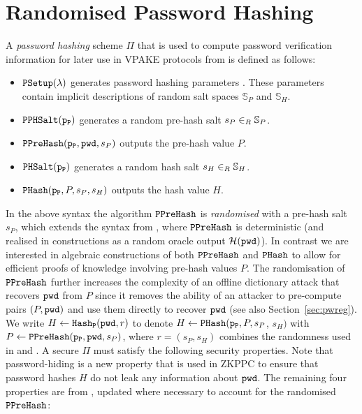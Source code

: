 \section{Randomised Password Hashing} \label{sec:strucphash}
A \emph{password hashing} scheme $\Pi$ that is used to compute password verification information for later use in VPAKE protocols from \cite{BenhamoudaP13} is defined as follows:
\begin{itemize}
	\item $\mathtt{PSetup}(\lambda)$ generates password hashing parameters \paramP. These parameters contain implicit descriptions of random salt spaces $\mathbb{S}_P$ and $\mathbb{S}_H$.
	\item $\mathtt{PPHSalt}(\mathtt{p_P})$ generates a random pre-hash salt $s_P\in_R\mathbb{S}_P$.
	\item $\mathtt{PPreHash}(\mathtt{p_P}, \mathtt{pwd}, s_P)$ outputs the pre-hash value $P$.
	\item $\mathtt{PHSalt}(\mathtt{p_P})$ generates a random hash salt $s_H\in_R\mathbb{S}_H$.
	\item $\mathtt{PHash}(\mathtt{p_P}, P, s_P, s_H)$ outputs the hash value $H$.
\end{itemize}
In the above syntax the algorithm $\mathtt{PPreHash}$ is \emph{randomised} with a pre-hash salt $s_P$, which extends the syntax from \cite{BenhamoudaP13}, where $\mathtt{PPreHash}$ is deterministic (and realised in constructions as a random oracle output $\mathcal{H}(\mathtt{pwd})$). In contrast we are interested in algebraic constructions of both $\mathtt{PPreHash}$ and $\mathtt{PHash}$ to allow for efficient proofs of knowledge involving pre-hash values $P$. The randomisation of $\mathtt{PPreHash}$ further increases the complexity of an offline dictionary attack that recovers $\mathtt{pwd}$ from $P$ since it removes the ability of an attacker to pre-compute pairs $(P,\mathtt{pwd})$ and use them directly to recover $\mathtt{pwd}$ (see also Section~\ref{sec:pwreg}). We write $H\gets \mathtt{Hash_P}(\mathtt{pwd},r)$ to denote $H\gets \mathtt{PHash}(\mathtt{p_P},P,s_P$, $s_H)$ with $P\gets\mathtt{PPreHash}(\mathtt{p_P},\mathtt{pwd},s_P)$, where $r=(s_P,s_H)$ combines the randomness used in \PHash and \PPreHash. A secure $\Pi$ must satisfy the following security properties. Note that password-hiding is a new property that is used in ZKPPC to ensure that password hashes $H$ do not leak any information about $\mathtt{pwd}$. The remaining four properties are from \cite{BenhamoudaP13}, updated where necessary to account for the randomised $\mathtt{PPreHash}$:
